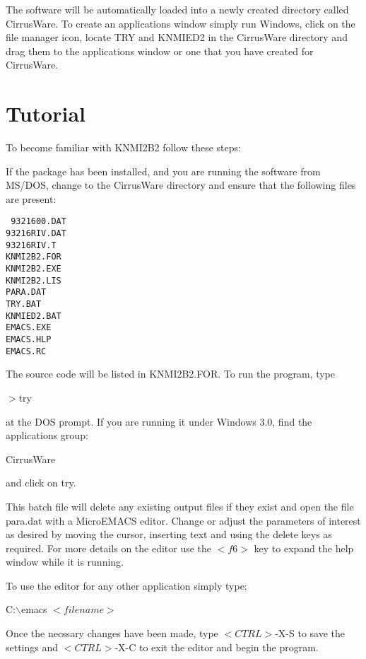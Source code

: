 The software will be automatically loaded into a newly created 
directory called CirrusWare. To create an applications window simply
run Windows, click on the file manager icon, locate TRY
and KNMIED2 in the CirrusWare directory and drag them to
the applications window or one that you have created for
CirrusWare. 

\section{Tutorial}

To become familiar with KNMI2B2 follow these steps:

If the package has been installed, and you are running 
the software from MS/DOS, change to the CirrusWare directory and ensure
that the following files are present:


\noindent
{\tt
9321600.DAT\\
93216RIV.DAT\\
93216RIV.T\\
KNMI2B2.FOR\\
KNMI2B2.EXE\\
KNMI2B2.LIS\\
PARA.DAT\\
TRY.BAT\\
KNMIED2.BAT\\
EMACS.EXE\\
EMACS.HLP\\
EMACS.RC\\
}

\noindent
The source code will be listed in KNMI2B2.FOR. To run the program, type

\begin{center}
	$>$try
\end{center}
\noindent
at the DOS prompt. If you are running it under Windows 3.0, find the
applications group:
\begin{center}
		CirrusWare
\end{center}
\noindent
and click on try.

This batch file will delete any existing output files if they exist
and open the file para.dat with a MicroEMACS editor. Change or adjust 
the parameters of interest as desired by moving the cursor, inserting 
text and using the delete keys as required. For more details on the
editor use the $<f6>$ key to expand the help window while it is running.

To use the editor for any other application simply type:
\begin{center}
		C:$\backslash$emacs $<filename>$
\end{center}
\noindent
Once the necssary changes have been made, type $<CTRL>$-X-S to save the
settings and $<CTRL>$-X-C to exit the editor and begin the program.

